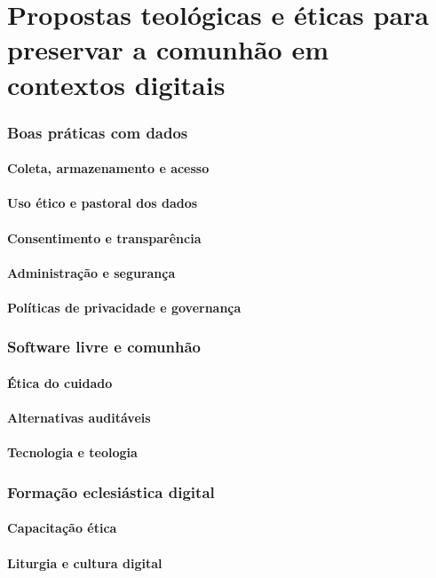 \newpage
\chapter{Propostas teológicas e éticas para preservar a comunhão em contextos digitais}

\subsection{Boas práticas com dados}
\subsubsection{Coleta, armazenamento e acesso}

\subsubsection{Uso ético e pastoral dos dados}

\subsubsection{Consentimento e transparência}

\subsubsection{Administração e segurança}

\subsubsection{Políticas de privacidade e governança}

\subsection{Software livre e comunhão}
\subsubsection{Ética do cuidado}

\subsubsection{Alternativas auditáveis}

\subsubsection{Tecnologia e teologia}

\subsection{Formação eclesiástica digital}
\subsubsection{Capacitação ética}

\subsubsection{Liturgia e cultura digital}
